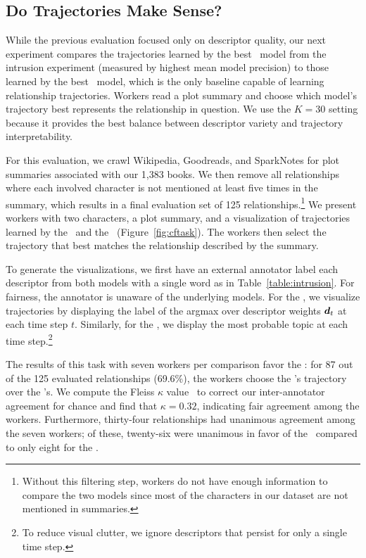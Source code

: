 \subsection{Do Trajectories Make Sense?}

While the previous evaluation focused only on descriptor quality, our next
experiment compares the trajectories learned by the best \rmn\ model from the
intrusion experiment (measured by highest mean model precision) to those learned
by the best \htmm\ model, which is the only baseline capable of learning
relationship trajectories. Workers read a plot summary and choose which model's
trajectory best represents the relationship in question. We use the $K=30$
setting because it provides the best balance between descriptor variety and
trajectory interpretability.

For this evaluation, we crawl Wikipedia, Goodreads, and SparkNotes for plot
summaries associated with our 1,383 books. We then remove all relationships
where each involved character is not mentioned at least five times in the
summary, which results in a final evaluation set of 125
relationships.\footnote{Without this filtering step, workers do not have enough
  information to compare the two models since most of the characters in our
  dataset are not mentioned in summaries.}  We present workers with two
characters, a plot summary, and a visualization of trajectories learned by the
\rmn\ and the \htmm\ (Figure~\ref{fig:cftask}). The workers then select the
trajectory that best matches the relationship described by the summary.

To generate the visualizations, we first have an external annotator label each
descriptor from both models with a single word as in
Table~\ref{table:intrusion}. For fairness, the annotator is unaware of the
underlying models. For the \rmn, we visualize trajectories by displaying the
label of the argmax over descriptor weights $\boldsymbol{d}_t$ at each time step
$t$. Similarly, for the \htmm, we display the most probable topic at each time
step.\footnote{To reduce visual clutter, we ignore descriptors that persist for
  only a single time step.}

The results of this task with seven workers per comparison favor the \rmn: for
87 out of the 125 evaluated relationships (69.6\%), the workers choose the
\rmn's trajectory over the \htmm's. We compute the Fleiss $\kappa$
value~\cite{fleiss1971measuring} to correct our inter-annotator agreement for
chance and find that $\kappa = 0.32$, indicating fair agreement among the
workers. Furthermore, thirty-four relationships had unanimous agreement among the seven
workers; of these, twenty-six were unanimous in favor of the \rmn\ compared to only eight
for the \htmm.

